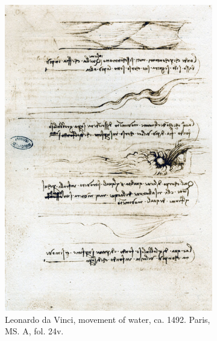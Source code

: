 \documentclass[12pt]{article}
\begin{document}
\begin{figure}[!htb]
	\begin{subfigure}{0.45\textwidth}
		\centering
		\includegraphics[height=0.4\textheight]{LdV_1}
		\caption{Leonardo da Vinci, movement of water, ca. 1492. Paris, MS. A, fol. 24v.}
		\label{fig:1}
	\end{subfigure}
\hspace{10pt}
	\begin{subfigure}{0.45\textwidth}
		\centering

\end{subfigure}
\end{figure}
\end{document}
